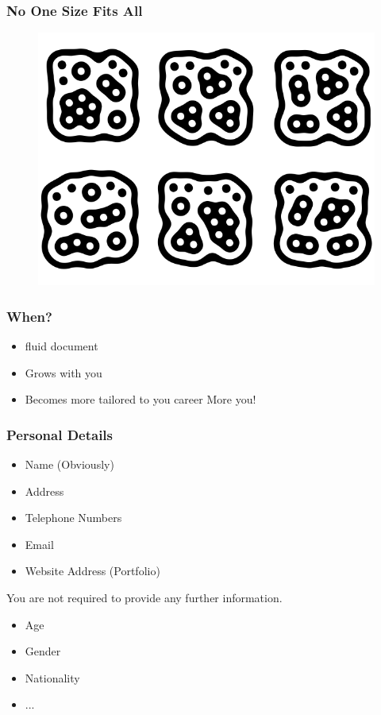 \begin{frame}
	\frametitle{No One Size Fits All}
	\begin{figure}
		\includegraphics[scale=.5]{assets/reactivision}
	\end{figure}
\end{frame}



\begin{frame}
	\frametitle{When?}
	\begin{itemize} 
		\item \pause fluid document
		\item \pause Grows with you
		\item \pause Becomes more tailored to you career 
		\pause More you! 
	\end{itemize}
\end{frame}


\begin{frame}
	\frametitle{Personal Details}
	
	\begin{itemize}
		\item Name (Obviously)
		\item Address
		\item Telephone Numbers
		\item Email
		\item Website Address (Portfolio)
	\end{itemize}

	\pause
	You are not required to provide any further information. 
	\begin{itemize}
		\item Age
		\item Gender
		\item Nationality
		\item ... 
	\end{itemize}

\end{frame}

